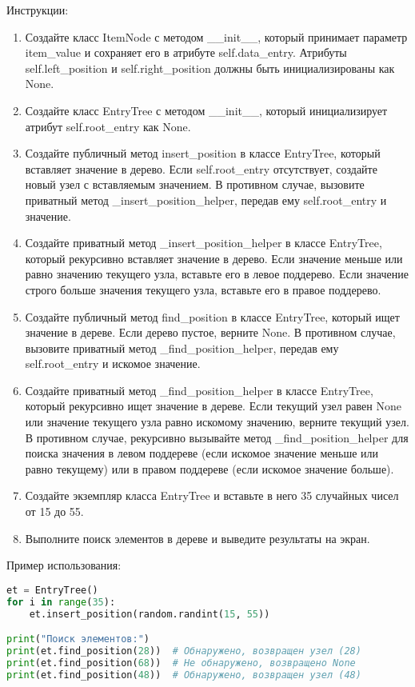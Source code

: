 \begin{enumerate}
Инструкции:
\begin{enumerate}
    \item Создайте класс ItemNode с методом \_\_init\_\_, который принимает параметр item\_value и сохраняет его в атрибуте self.data\_entry. Атрибуты self.left\_position и self.right\_position должны быть инициализированы как None.
    \item Создайте класс EntryTree с методом \_\_init\_\_, который инициализирует атрибут self.root\_entry как None.
    \item Создайте публичный метод insert\_position в классе EntryTree, который вставляет значение в дерево. Если self.root\_entry отсутствует, создайте новый узел с вставляемым значением. В противном случае, вызовите приватный метод \_insert\_position\_helper, передав ему self.root\_entry и значение.
    \item Создайте приватный метод \_insert\_position\_helper в классе EntryTree, который рекурсивно вставляет значение в дерево. Если значение меньше или равно значению текущего узла, вставьте его в левое поддерево. Если значение строго больше значения текущего узла, вставьте его в правое поддерево.
    \item Создайте публичный метод find\_position в классе EntryTree, который ищет значение в дереве. Если дерево пустое, верните None. В противном случае, вызовите приватный метод \_find\_position\_helper, передав ему self.root\_entry и искомое значение.
    \item Создайте приватный метод \_find\_position\_helper в классе EntryTree, который рекурсивно ищет значение в дереве. Если текущий узел равен None или значение текущего узла равно искомому значению, верните текущий узел. В противном случае, рекурсивно вызывайте метод \_find\_position\_helper для поиска значения в левом поддереве (если искомое значение меньше или равно текущему) или в правом поддереве (если искомое значение больше).
    \item Создайте экземпляр класса EntryTree и вставьте в него 35 случайных чисел от 15 до 55.
    \item Выполните поиск элементов в дереве и выведите результаты на экран.
\end{enumerate}

Пример использования:
\begin{lstlisting}[language=Python]
et = EntryTree()
for i in range(35):
    et.insert_position(random.randint(15, 55))

print("Поиск элементов:")
print(et.find_position(28))  # Обнаружено, возвращен узел (28)
print(et.find_position(68))  # Не обнаружено, возвращено None
print(et.find_position(48))  # Обнаружено, возвращен узел (48)
\end{lstlisting}


\end{enumerate}
